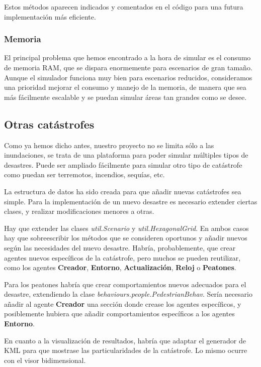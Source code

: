 Estos métodos aparecen indicados y comentados en el código para una futura
implementación más eficiente.

\subsubsection{Memoria}

El principal problema que hemos encontrado a la hora de simular es el consumo
de memoria RAM, que se dispara enormemente para escenarios de gran tamaño.
Aunque el simulador funciona muy bien para escenarios reducidos, consideramos
una prioridad mejorar el consumo y manejo de la memoria, de manera que sea más
fácilmente escalable y se puedan simular áreas tan grandes como se desee.

\subsection{Otras catástrofes}

Como ya hemos dicho antes, nuestro proyecto no se limita sólo a las
inundaciones, se trata de una plataforma para poder simular múltiples tipos de
desastres. Puede ser ampliado fácilmente para simular otro tipo de catástrofe
como puedan ser terremotos, incendios, sequías, etc.

La estructura de datos ha sido creada para que añadir nuevas catástrofes sea
simple. Para la implementación de un nuevo desastre es necesario extender
ciertas clases, y realizar modificaciones menores a otras.

Hay que extender las clases {\em util.Scenario} y {\em util.HexagonalGrid}. En
ambos casos hay que sobreescribir los métodos que se consideren oportunos y
añadir nuevos según las necesidades del nuevo desastre. Habría, probablemente,
que crear agentes nuevos específicos de la catástrofe, pero muchos se pueden
reutilizar, como los agentes {\bf Creador}, {\bf Entorno}, {\bf Actualización},
{\bf Reloj} o {\bf Peatones}.

Para los peatones habría que crear comportamientos nuevos adecuados para el
desastre, extendiendo la clase {\em behaviours.people.PedestrianBehav}. Sería
necesario añadir al agente {\bf Creador} una sección donde crease los agentes
específicos, y posiblemente hubiera que añadir comportamientos específicos a
los agentes {\bf Entorno}.

En cuanto a la visualización de resultados, habría que adaptar el generador de
KML para que mostrase las particularidades de la catástrofe. Lo mismo ocurre
con el visor bidimensional.


